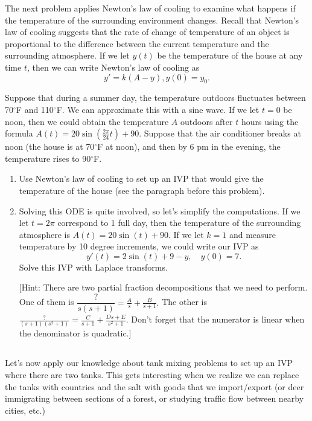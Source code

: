 The next problem applies Newton's law of cooling to examine what happens if the temperature of the surrounding environment changes. Recall that Newton's law of cooling suggests that the rate of change of temperature of an object is proportional to the difference between the current temperature and the surrounding atmosphere.  If we let $y(t)$ be the temperature of the house at any time $t$, then we can write Newton's law of cooling as $$y'=k(A-y), y(0)=y_0.$$

\begin{problem}
 Suppose that during a summer day, the temperature outdoors fluctuates between 70$^\circ$F and 110$^\circ$F.  We can approximate this with a sine wave. If we let $t=0$ be noon, then we could obtain the temperature $A$ outdoors after $t$ hours using the formula 
$A(t) = 20\sin(\frac{2\pi}{24} t)+90.$ 
Suppose that the air conditioner breaks at noon (the house is at 70$^\circ$F at noon), and then by 6 pm in the evening, the temperature rises to 90$^\circ$F.
\begin{enumerate}
\item Use Newton's law of cooling to set up an IVP that would give the temperature of the house (see the paragraph before this problem).
\item {}%
Solving this ODE is quite involved, so let's simplify the computations. If we let $t=2\pi$ correspond to 1 full day, then the temperature of the surrounding atmosphere is $A(t) =20\sin(t)+90.$ If we let $k=1$ and measure temperature by 10 degree increments, we could write our IVP as 
$$y'(t) = 2\sin(t)+9-y, \quad y(0)=7.$$
Solve this IVP with Laplace transforms. 

%
[Hint: There are two partial fraction decompositions that we need to perform. One of them is $\dfrac{?}{s(s+1)} = \frac{A}{s}+\frac{B}{s+1}.$ The other is $\frac{?}{(s+1)(s^2+1)} = \frac{C}{s+1}+\frac{Ds+E}{s^2+1}$. Don't forget that the numerator is linear when the denominator is quadratic.]    
\end{enumerate}
\end{problem}


\subsection*{\ideaE}
Let's now apply our knowledge about tank mixing problems to set up an IVP where there are two tanks.  This gets interesting when we realize we can replace the tanks with countries and the salt with goods that we import/export (or deer immigrating between sections of a forest, or studying traffic flow between nearby cities, etc.)

